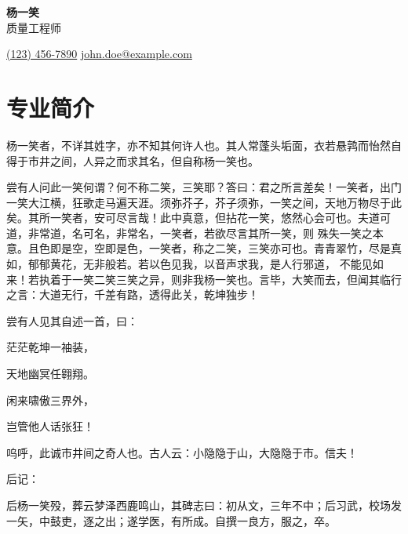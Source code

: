 \documentclass[a4paper,10pt]{article}
\begin{document}
\pagestyle{empty}

\begin{center}
    \textbf{\Huge 杨一笑} \\
    \vspace{2mm}
     质量工程师
\end{center}

\vspace{4mm}
\begin{center}
     \href{https://wa.me/1234567890}{(123) 456-7890} \hspace{2cm}
     \href{mailto:john.doe@example.com}{john.doe@example.com} \hspace{2cm}
\end{center}


\space
\section*{ 专业简介}

杨一笑者，不详其姓字，亦不知其何许人也。其人常蓬头垢面，衣若悬鹑而怡然自得于市井之间，人异之而求其名，但自称杨一笑也。

尝有人问此一笑何谓？何不称二笑，三笑耶？答曰：君之所言差矣！一笑者，出门一笑大江横，狂歌走马遍天涯。须弥芥子，芥子须弥，一笑之间，天地万物尽于此矣。其所一笑者，安可尽言哉！此中真意，但拈花一笑，悠然心会可也。夫道可道，非常道，名可名，非常名，一笑者，若欲尽言其所一笑，则 殊失一笑之本意。且色即是空，空即是色，一笑者，称之二笑，三笑亦可也。青青翠竹，尽是真如，郁郁黄花，无非般若。若以色见我，以音声求我，是人行邪道， 不能见如来！若执着于一笑二笑三笑之异，则非我杨一笑也。言毕，大笑而去，但闻其临行之言：大道无行，千差有路，透得此关，乾坤独步！

尝有人见其自述一首，曰：

    茫茫乾坤一袖装，

    天地幽冥任翱翔。

    闲来啸傲三界外，

    岂管他人话张狂！

呜呼，此诚市井间之奇人也。古人云：小隐隐于山，大隐隐于市。信夫！

后记：

后杨一笑殁，葬云梦泽西鹿鸣山，其碑志曰：初从文，三年不中；后习武，校场发一矢，中鼓吏，逐之出；遂学医，有所成。自撰一良方，服之，卒。
\end{document}
